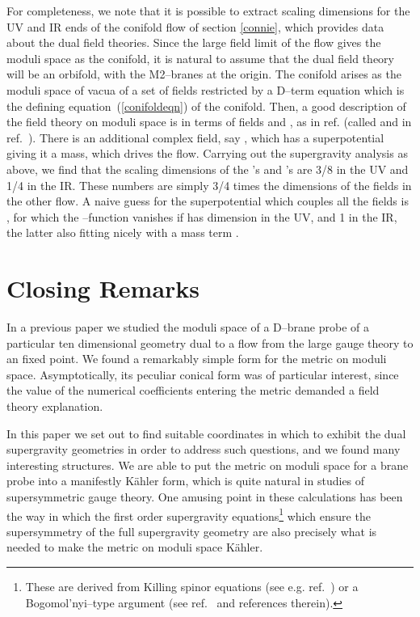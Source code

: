 \documentclass[a4paper,12pt]{article}
\providecommand{\reef}[1]{(\ref{#1})}
\begin{document}
For completeness, we note that it is possible to extract scaling
dimensions for the UV and IR ends of the conifold flow of section
\ref{connie}, which provides data about the dual field theories. Since
the large field limit of the flow gives the moduli space as the
conifold, it is natural to assume that the dual field theory will be
an orbifold, with the M2--branes at the origin. The conifold arises as
the moduli space of vacua of a set of fields restricted by a D--term
equation which is the defining equation~\reef{conifoldeqn} of the
conifold. Then, a good description of the field theory on moduli space
is in terms of fields \coordHE{} and \coordHE{}, as in ref.\cite{kw}
(called \coordHE{} and \coordHE{} in ref.~\cite{mp}). There is an additional
complex field, say \myHighlight{$\Phi$}\coordHE{}, which has a superpotential giving it a
mass, which drives the flow.  Carrying out the supergravity analysis
as above, we find that the scaling dimensions of the \coordHE{}'s and \coordHE{}'s
are 3/8 in the UV and 1/4 in the IR.  These numbers are simply 3/4
times the dimensions of the fields in the other flow. A naive guess
for the superpotential which couples all the fields is \coordHE{}, for which
the \myHighlight{$\beta$}\coordHE{}--function vanishes if \myHighlight{$\Phi$}\coordHE{} has dimension \coordHE{} in the
UV, and 1 in the IR, the latter also fitting nicely with a mass term
\coordHE{}.

\section{Closing Remarks}

In a previous paper\cite{jlp} we studied the moduli space of a
D--brane probe of a particular ten dimensional geometry dual to a flow
from the \coordHE{} large \coordHE{}  \coordHE{} gauge theory to an \coordHE{} fixed point. We found a remarkably simple form for the metric
on moduli space. Asymptotically, its peculiar conical form was of
particular interest, since the value of the numerical coefficients
entering the metric demanded a field theory explanation.

In this paper we set out to find suitable coordinates in which to
exhibit the dual supergravity geometries in order to address such
questions, and we found many interesting structures.  We are able to
put the metric on moduli space for a brane probe into a manifestly
K\"ahler form, which is quite natural in  studies of
supersymmetric gauge theory. One amusing point in these calculations
has been the way in which the first order supergravity
equations\footnote{These are derived from Killing spinor equations
  (see e.g. ref.~\cite{freed1}) or a Bogomol'nyi--type argument (see
  ref.~\cite{bakas2} and references therein).} which ensure the \coordHE{} supersymmetry of the full supergravity geometry are also
precisely what is needed to make the metric on moduli space K\"ahler.
\end{document}
